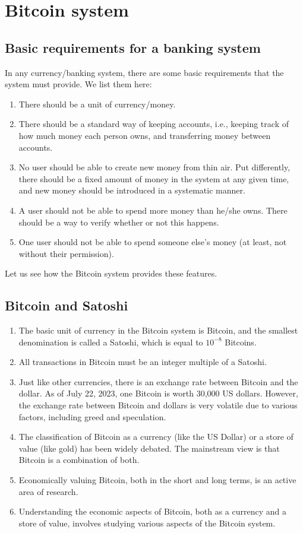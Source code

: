 \chapter{Bitcoin system}

\section{Basic requirements for a banking system}

In any currency/banking system, there are some basic requirements that the system must provide. We list them here:
\begin{enumerate}
    \item There should be a unit of currency/money.
    \item There should be a standard way of keeping accounts, i.e., keeping track of how much money each person owns, and transferring money between accounts.
    \item No user should be able to create new money from thin air. Put diﬀerently, there should be a
    fixed amount of money in the system at any given time, and new money should be introduced in a systematic manner.
    \item A user should not be able to spend more money than he/she owns. There should be a way to verify whether or not this happens.
    \item One user should not be able to spend someone else’s money (at least, not without their permission).
     
\end{enumerate}
Let us see how the Bitcoin system provides these features.

\section{Bitcoin and Satoshi}
\begin{enumerate}
    \item The basic unit of currency in the Bitcoin system is Bitcoin, and the smallest denomination is called a Satoshi, which is equal to $10^{-8}$ Bitcoins.
    \item All transactions in Bitcoin must be an integer multiple of a Satoshi.
    \item Just like other currencies, there is an exchange rate between Bitcoin and the dollar. As of July 22, 2023, one Bitcoin is worth 30,000 US dollars. However, the exchange rate between Bitcoin and dollars is very volatile due to various factors, including greed and speculation.
    \item The classification of Bitcoin as a currency (like the US Dollar) or a store of value (like gold) has been widely debated. The mainstream view is that Bitcoin is a combination of both.
    \item Economically valuing Bitcoin, both in the short and long terms, is an active area of research.
    \item Understanding the economic aspects of Bitcoin, both as a currency and a store of value, involves studying various aspects of the Bitcoin system.
\end{enumerate}

